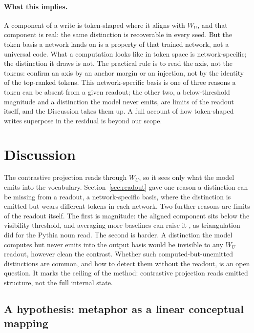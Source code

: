 \documentclass[11pt]{article}
\newcommand{\WU}{W_U}
\begin{document}
\paragraph{What this implies.} A component of a write is token-shaped where it
aligns with $\WU$, and that component is real: the same distinction is
recoverable in every seed. But the token basis a network lands on is a property
of that trained network, not a universal code. What a computation looks like in
token space is network-specific; the distinction it draws is not. The practical
rule is to read the axis, not the tokens: confirm an axis by an anchor margin or
an injection, not by the identity of the top-ranked tokens. This network-specific
basis is one of three reasons a token can be absent from a given readout; the
other two, a below-threshold magnitude and a distinction the model never emits,
are limits of the readout itself, and the Discussion takes them up. A full
account of how token-shaped writes superpose in the residual is beyond our scope.

\section{Discussion}

The contrastive projection reads through $\WU$, so it sees only what the model
emits into the vocabulary. Section~\ref{sec:readout} gave one reason a
distinction can be missing from a readout, a network-specific basis, where the
distinction is emitted but wears different tokens in each network. Two further
reasons are limits of the readout itself. The first is magnitude: the aligned
component sits below the visibility threshold, and averaging more baselines can
raise it \citep{tuomi2026visibility}, as triangulation did for the Pythia noun
read. The second is harder. A distinction the model computes but never emits into
the output basis would be invisible to any $\WU$ readout, however clean the
contrast. Whether such computed-but-unemitted distinctions are common, and how to
detect them without the readout, is an open question. It marks the ceiling of the
method: contrastive projection reads emitted structure, not the full internal
state.

\subsection{A hypothesis: metaphor as a linear conceptual mapping}
\end{document}
